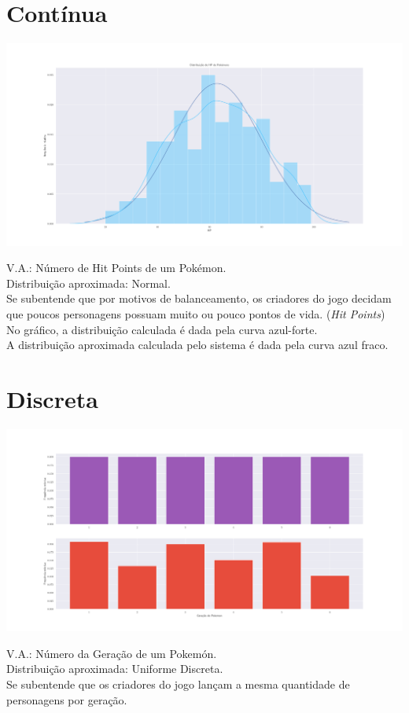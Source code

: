 \documentclass[11pt,a4paper]{report}
\begin{document}
\section*{Contínua}
\begin{center}
	\hspace*{-3.5cm}\includegraphics[clip, trim=0cm 0cm 0.0cm 0cm, width=1.7\linewidth]{continua.pdf}

\end{center}
V.A.: Número de Hit Points de um Pokémon. \\
Distribuição aproximada: Normal.\\
Se subentende que por motivos de balanceamento, os criadores do jogo decidam que poucos personagens possuam muito ou pouco pontos de vida. ({\it Hit Points})\\
No gráfico, a distribuição calculada é dada pela curva azul-forte.\\
A distribuição aproximada calculada pelo sistema é dada pela curva azul fraco.\\

\section*{Discreta}
\begin{center}
	\hspace*{-3.5cm}\includegraphics[clip, trim=0cm 0cm 0.0cm 0cm, width=1.7\linewidth]{discreta.pdf}
	
\end{center}
V.A.: Número da Geração de um Pokemón.\\
Distribuição aproximada: Uniforme Discreta.\\
Se subentende que os criadores do jogo lançam a mesma quantidade de personagens por geração.
\end{document}
